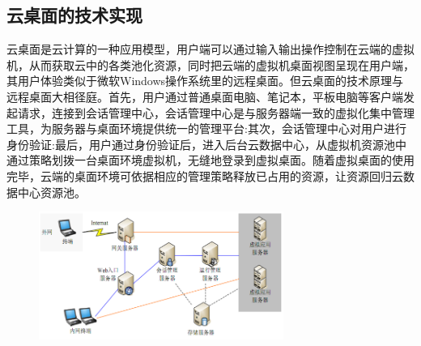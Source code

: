 \documentclass{article}
\begin{document}
\subsection{云桌面的技术实现}\par
云桌面是云计算的一种应用模型，用户端可以通过输入输出操作控制在云端的虚拟机，从而获取云中的各类池化资源，同时把云端的虚拟机桌面视图呈现在用户端，其用户体验类似于微软Windows操作系统里的远程桌面。但云桌面的技术原理与远程桌面大相径庭。首先，用户通过普通桌面电脑、笔记本，平板电脑等客户端发起请求，连接到会话管理中心，会话管理中心是与服务器端一致的虚拟化集中管理工具，为服务器与桌面环境提供统一的管理平台:其次，会话管理中心对用户进行身份验证:最后，用户通过身份验证后，进入后台云数据中心，从虚拟机资源池中通过策略划拨一台桌面环境虚拟机，无缝地登录到虚拟桌面。随着虚拟桌面的使用完毕，云端的桌面环境可依据相应的管理策略释放已占用的资源，让资源回归云数据中心资源池。\citep{cc}
    \begin{figure}[H]
	\centering
	\includegraphics[width=8cm]{222.png}
	\label{figupc}
	
\end{figure}
\end{document}
